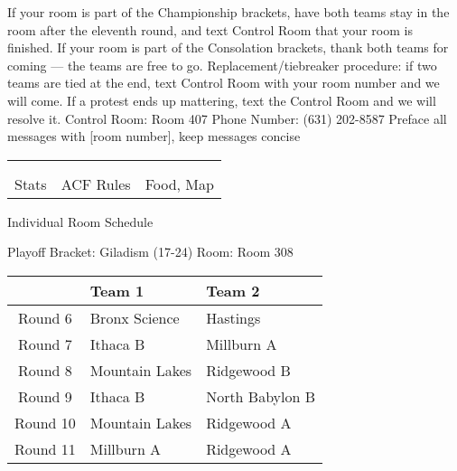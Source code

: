 \documentclass{article}%
\begin{document}
\vspace*{16pt}%
\linebreak%
If your room is part of the Championship brackets, have both teams stay in the room after the eleventh round, and text Control Room that your room is finished.\newline%
\newline%
If your room is part of the Consolation brackets, thank both teams for coming — the teams are free to go.\newline%
\newline%
Replacement/tiebreaker procedure: if two teams are tied at the end, text Control Room with your room number and we will come. If a protest ends up mattering, text the Control Room and we will resolve it.\newline%
\newline%
Control Room: Room 407\newline%
Phone Number: (631) 202{-}8587\newline%
Preface all messages with {[}room number{]}, keep messages concise%
\vspace*{30pt}%
\newline%
%
\begin{tabularx}{\textwidth}{YYY}%
  &  &  \\%
\\%
Stats&ACF Rules&Food, Map\\%
\end{tabularx}%
\newpage%
\begin{center}%
\begin{Huge}%
Individual Room Schedule%
\end{Huge}%
\vspace*{16pt}%
\linebreak%
\begin{Large}%
Playoff Bracket: Giladism (17-24) \hfill Room: Room 308%
\end{Large}%
\end{center}%
%
\begin{tabularx}{\textwidth}{|c|Y|Y|}%
\hline%
&Team 1&Team 2\\%
\hline%
Round 6&Bronx Science&Hastings\\%
Round 7&Ithaca B&Millburn A\\%
Round 8&Mountain Lakes&Ridgewood B\\%
Round 9&Ithaca B&North Babylon B\\%
Round 10&Mountain Lakes&Ridgewood A\\%
Round 11&Millburn A&Ridgewood A\\%
\hline%
\end{tabularx}%
\end{document}
